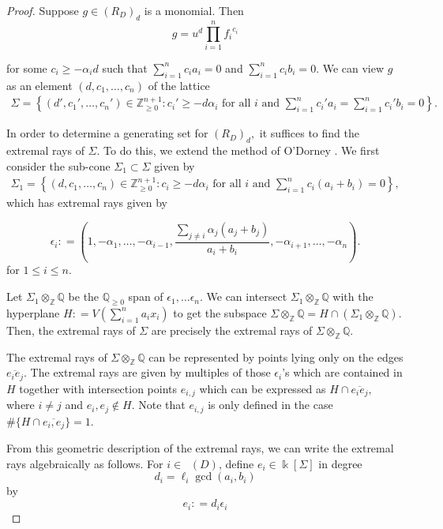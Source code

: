 \documentclass{amsart}
\theoremstyle{plain}
\theoremstyle{definition}
\theoremstyle{remark}
\numberwithin{equation}{section}
\newcommand\bq{{\mathbb Q}}
\newcommand\bz{{\mathbb Z}}
\newcommand\bk{{\Bbbk}}
\newcommand\bida{a}
\newcommand\bidb{b}
\DeclareMathOperator{\Te}{T_=}
\begin{document}
\begin{proof}
Suppose $g
\in (R_D)_d$ is a monomial.
 Then 
\[
	g = u^d \prod_{i = 1}^n {f_i}^{c_i}
\]

\noindent
for some $c_i \ge - \alpha_i d$ such that $\sum_{i=1}^n c_i \bida_i = 0$
and $\sum_{i=1}^n c_i \bidb_i = 0$. We can view $g$ as an element $(d, c_1, \ldots, c_n)$ of the
lattice 
\begin{align*}
	\Sigma = \left\{ (d', c_1', \ldots, c_n') \in \bz_{\geq 0}^{n+1} \colon c_i' \ge - d
\alpha_i \text{ for all }i \text{ and }\sum_{i=1}^n c_i' \bida_i = \sum_{i =
1}^n c_i' \bidb_i = 0 \right \}.	
\end{align*}

In order to determine a generating
set for $(R_D)_d,$ it suffices to find the extremal rays of $\Sigma.$
To do this, we extend the method of O'Dorney \cite[Theorem 8]{dorney:canonical}. 
We first consider the sub-cone $\Sigma_1 \subset \Sigma$
given by
\begin{align*}
	\Sigma_1 = \left\{ (d, c_1, \ldots, c_n) \in \bz_{\geq 0}^{n+1} \colon c_i \ge -
d \alpha_i \text{ for all }i \text{ and }\sum_{i=1}^n c_i (\bida_i+\bidb_i) = 0
\right\},
\end{align*}
which
has extremal rays given by
 
\[
	\epsilon_i \colon = \left(1, -\alpha_1, \ldots, -\alpha_{i-1}, \frac{\sum_{j \ne i}
	\alpha_j (\bida_j + \bidb_j)}{\bida_i + \bidb_i}, -\alpha_{i + 1},
	\ldots, -\alpha_n \right).
\]
for $1 \leq i \leq n$.

Let $\Sigma_1 \otimes_\bz \bq$ be the $\bq_{\ge 0}$ span of $\epsilon_1, \ldots \epsilon_n$.
We can intersect $\Sigma_1 \otimes_\bz \bq$ with the hyperplane $H \colon =
V(\sum_{i=1}^n \bida_i x_i)$  to get the subspace $\Sigma \otimes_\bz \bq = H \cap (\Sigma_1
\otimes_\bz \bq)$.  Then, the extremal rays of $\Sigma$ are precisely the extremal 
rays of $\Sigma \otimes_\bz \bq$.

The extremal rays of $\Sigma \otimes_\bz \bq$ can be represented by points
lying only on the edges 
$\overline{e_i e_j}$.
The extremal rays are given by multiples of those $\epsilon_i$'s
which are contained in $H$ together with intersection points $e_{i, j}$ which
can be expressed as $H \cap \overline{e_i e_j},$ where $i \neq j$ and $e_i,
e_j \notin H$. Note that $e_{i,j}$ is only defined in the case
$\# \{H \cap \overline{e_i, e_j}\} = 1$.


From this geometric description of the extremal rays, we can write
the extremal rays algebraically as follows.
For $i \in \Te(D)$, define $e_i \in \bk[\Sigma]$ in degree 
\[
	d_i = \ell_i \gcd(a_i, b_i)
\]
by 
\begin{equation}\label{eqn:epsilon_i}
	e_i \colon = d_i \epsilon_i %
\end{equation}


\end{proof}
\end{document}
